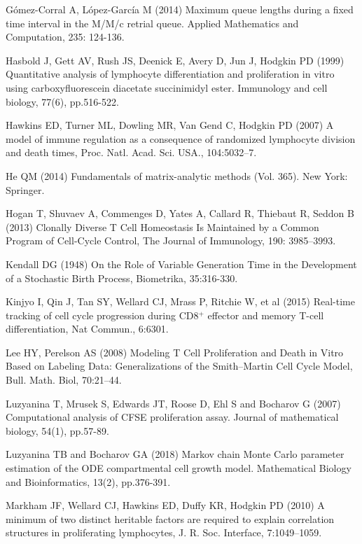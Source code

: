 \documentclass[10pt]{article}
\numberwithin{equation}{section}
\begin{document}
\begin{thebibliography}{}
G\'omez-Corral A, L\'opez-Garc\'ia M (2014)
Maximum queue lengths during a fixed time interval in the {M}/{M}/c retrial queue. Applied Mathematics and Computation, 235: 124-136.

Hasbold J, Gett AV, Rush JS, Deenick E, Avery D, Jun J, Hodgkin PD (1999) Quantitative analysis of lymphocyte differentiation and proliferation in vitro using carboxyfluorescein diacetate succinimidyl ester. Immunology and cell biology, 77(6), pp.516-522.

Hawkins ED, Turner ML, Dowling MR, Van Gend C, Hodgkin PD (2007) A model of immune regulation as a consequence of randomized lymphocyte division and death times, Proc. Natl. Acad. Sci. USA., 104:5032–7.

He QM (2014) Fundamentals of matrix-analytic methods (Vol. 365). New York: Springer.

Hogan T, Shuvaev A, Commenges D, Yates A, Callard R, Thiebaut R, Seddon B (2013) Clonally Diverse T Cell Homeostasis Is Maintained by a Common Program of Cell-Cycle Control, The Journal of Immunology, 190: 3985–3993.

Kendall DG (1948) On the Role of Variable Generation Time in the Development of a Stochastic Birth Process, Biometrika, 35:316-330.

Kinjyo I, Qin J, Tan SY, Wellard CJ, Mrass P, Ritchie W, et al (2015) Real-time tracking of cell cycle progression during CD8$^+$ effector and memory T-cell differentiation, Nat Commun., 6:6301.

Lee HY, Perelson AS (2008) Modeling T Cell Proliferation and Death in Vitro Based on Labeling Data: Generalizations of the Smith–Martin Cell Cycle Model, Bull. Math. Biol, 70:21–44. 

Luzyanina T, Mrusek S, Edwards JT, Roose D, Ehl S and Bocharov G (2007) Computational analysis of CFSE proliferation assay. Journal of mathematical biology, 54(1), pp.57-89.

Luzyanina TB and Bocharov GA (2018) Markov chain Monte Carlo parameter estimation of the ODE compartmental cell growth model. Mathematical Biology and Bioinformatics, 13(2), pp.376-391.

Markham JF, Wellard CJ, Hawkins ED, Duffy KR, Hodgkin PD (2010) A minimum of two distinct heritable factors are required to explain correlation structures in proliferating lymphocytes, J. R. Soc. Interface, 7:1049–1059.


\end{thebibliography}
\end{document}
